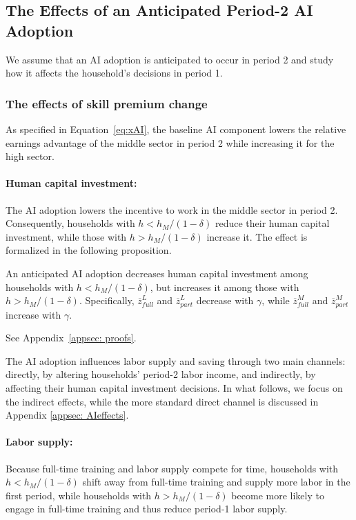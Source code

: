 \documentclass[12pt,english]{article}
\makeatletter
\numberwithin{equation}{section}
\renewenvironment{proof}[1][\proofname]{\par
    \pushQED{\qed}%
    \normalfont \topsep2\p@\@plus6\p@\relax
    \trivlist
    \item\relax
    {\itshape #1\@addpunct{.}}\hspace\labelsep\ignorespaces
}{%
    \popQED\endtrivlist\@endpefalse
}
\let\originaleqref\eqref
\renewcommand{\eqref}{Equation~\originaleqref}
\makeatother
\begin{document}
\subsection{The Effects of an Anticipated Period-2 AI Adoption}
We assume that an AI adoption is anticipated to occur in period 2 and study how it affects the household's decisions in period 1. 

\subsubsection{The effects of skill premium change}
As specified in \eqref{eq:xAI}, the baseline AI component lowers the relative earnings advantage of the middle sector in period 2 while increasing it for the high sector.


\paragraph{Human capital investment:} 
The AI adoption lowers the incentive to work in the middle sector in period 2. Consequently, households with $h < h_M/(1-\delta)$ reduce their human capital investment, while those with $h > h_M/(1-\delta)$ increase it. The effect is formalized in the following proposition.

\begin{proposition}\label{prop:AI_human_capital}
An anticipated AI adoption decreases human capital investment among households with $h < h_M/(1-\delta)$, but increases it among those with $h > h_M/(1-\delta)$. Specifically, $\overline{z}^L_{full}$ and $\overline{z}^L_{part}$ decrease with $\gamma$, while $\overline{z}^M_{full}$ and $\overline{z}^M_{part}$ increase with $\gamma$.
\end{proposition}
\begin{proof}
    See Appendix~\ref{appsec: proofs}.
\end{proof}

\noindent The AI adoption influences labor supply and saving through two main channels: directly, by altering households’ period-2 labor income, and indirectly, by affecting their human capital investment decisions. In what follows, we focus on the indirect effects, while the more standard direct channel is discussed in Appendix \ref{appsec: AIeffects}.

\paragraph{Labor supply:} Because full-time training and labor supply compete for time, households with $h<h_M/(1-\delta)$ shift away from full-time training and supply more labor in the first period, while households with $h>h_M/(1-\delta)$ become more likely to engage in full-time training and thus reduce period-1 labor supply. 
\end{document}
